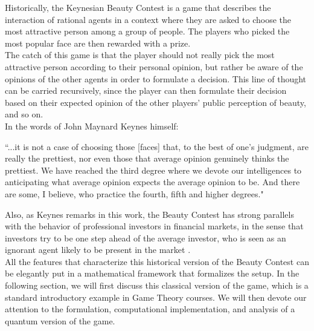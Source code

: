 Historically, the Keynesian Beauty Contest is a game that describes the interaction of rational agents in a context where they are asked to choose the most attractive person among a group of people. The players who picked the most popular face are then rewarded with a prize.\\

The catch of this game is that the player should not really pick the most attractive person according to their personal opinion, but rather be aware of the opinions of the other agents in order to formulate a decision. This line of thought can be carried recursively, since the player can then formulate their decision based on their expected opinion of the other players' public perception of beauty, and so on.\\

In the words of John Maynard Keynes himself:
\begin{displayquote}
``...it is not a case of choosing those [faces] that, to the best of one's judgment, are really the prettiest, nor even those that average opinion genuinely thinks the prettiest. We have reached the third degree where we devote our intelligences to anticipating what average opinion expects the average opinion to be. And there are some, I believe, who practice the fourth, fifth and higher degrees." \citep{Keynes_1936}
\end{displayquote}
Also, as Keynes remarks in this work, the Beauty Contest has strong parallels with the behavior of professional investors in financial markets, in the sense that investors try to be one step ahead of the average investor, who is seen as an ignorant agent likely to be present in the market \citep{Duffy1997beauty}.\\

All the features that characterize this historical version of the Beauty Contest can be elegantly put in a mathematical framework that formalizes the setup. In the following section, we will first discuss this classical version of the game, which is a standard introductory example in Game Theory courses. We will then devote our attention to the formulation, computational implementation, and analysis of a quantum version of the game.\\
